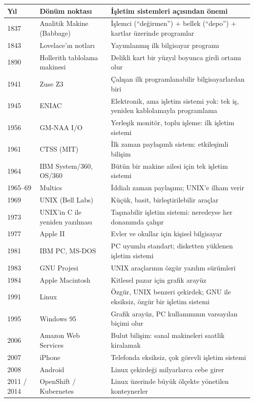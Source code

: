 \documentclass[11pt,a4paper]{article}
\begin{document}
\begin{center}
\small
\renewcommand{\arraystretch}{1.25}
\begin{longtable}{@{}p{1.9cm}p{4.3cm}p{8.4cm}@{}}
\toprule
\textbf{Yıl} & \textbf{Dönüm noktası} & \textbf{İşletim sistemleri açısından önemi} \\
\midrule
\endhead
1837 & Analitik Makine (Babbage) & İşlemci (``değirmen'') + bellek (``depo'') + kartlar üzerinde programlar \\
1843 & Lovelace'ın notları & Yayımlanmış ilk bilgisayar programı \\
1890 & Hollerith tablolama makinesi & Delikli kart bir yüzyıl boyunca girdi ortamı olur \\
1941 & Zuse Z3 & Çalışan ilk programlanabilir bilgisayarlardan biri \\
1945 & ENIAC & Elektronik, ama işletim sistemi yok: tek iş, yeniden kablolamayla programlama \\
1956 & GM-NAA I/O & Yerleşik monitör, toplu işleme: ilk işletim sistemi \\
1961 & CTSS (MIT) & İlk zaman paylaşımlı sistem: etkileşimli bilişim \\
1964 & IBM System/360, OS/360 & Bütün bir makine ailesi için tek işletim sistemi \\
1965--69 & Multics & İddialı zaman paylaşımı; UNIX'e ilham verir \\
1969 & UNIX (Bell Labs) & Küçük, basit, birleştirilebilir araçlar \\
1973 & UNIX'in C ile yeniden yazılması & Taşınabilir işletim sistemi: neredeyse her donanımda çalışır \\
1977 & Apple II & Evler ve okullar için kişisel bilgisayar \\
1981 & IBM PC, MS-DOS & PC uyumlu standart; disketten yüklenen işletim sistemi \\
1983 & GNU Projesi & UNIX araçlarının özgür yazılım sürümleri \\
1984 & Apple Macintosh & Kitlesel pazar için grafik arayüz \\
1991 & Linux & Özgür, UNIX benzeri çekirdek; GNU ile eksiksiz, özgür bir işletim sistemi \\
1995 & Windows 95 & Grafik arayüz, PC kullanımının varsayılan biçimi olur \\
2006 & Amazon Web Services & Bulut bilişim: sanal makineleri saatlik kiralamak \\
2007 & iPhone & Telefonda eksiksiz, çok görevli işletim sistemi \\
2008 & Android & Linux çekirdeği milyarlarca cebe girer \\
2011 / 2014 & OpenShift / Kubernetes & Linux üzerinde büyük ölçekte yönetilen konteynerler \\
\bottomrule
\end{longtable}
\end{center}
\end{document}
